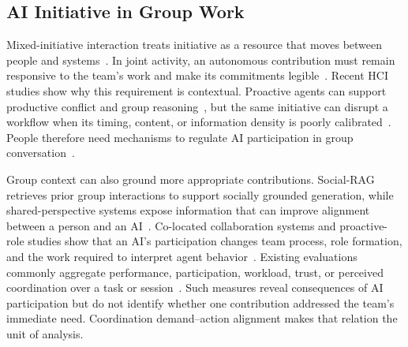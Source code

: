 \documentclass[manuscript,review,anonymous]{acmart}
\begin{document}
\subsection{AI Initiative in Group Work}
Mixed-initiative interaction treats initiative as a resource that moves between people and systems~\cite{horvitz1999principles}. In joint activity, an autonomous contribution must remain responsive to the team's work and make its commitments legible~\cite{cila2022designing,cheng2025behalf}. Recent HCI studies show why this requirement is contextual. Proactive agents can support productive conflict and group reasoning~\cite{chen2025balanced,liu2025innerthoughts}, but the same initiative can disrupt a workflow when its timing, content, or information density is poorly calibrated~\cite{pu2025assistance,chen2025needhelp}. People therefore need mechanisms to regulate AI participation in group conversation~\cite{houde2025controlling}.

Group context can also ground more appropriate contributions. Social-RAG retrieves prior group interactions to support socially grounded generation, while shared-perspective systems expose information that can improve alignment between a person and an AI~\cite{wang2025socialrag,teng2026eye}. Co-located collaboration systems and proactive-role studies show that an AI's participation changes team process, role formation, and the work required to interpret agent behavior~\cite{zhang2025ladica,mukhopadhyay2026roles,lim2026formation,pareek2026sensemaking}. Existing evaluations commonly aggregate performance, participation, workload, trust, or perceived coordination over a task or session~\cite{ma2025deliberation}. Such measures reveal consequences of AI participation but do not identify whether one contribution addressed the team's immediate need. Coordination demand--action alignment makes that relation the unit of analysis.
\end{document}
